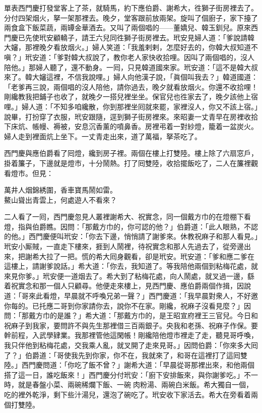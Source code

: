 單表西門慶打發堂客上了茶，就騎馬，約下應伯爵、謝希大，徃獅子街房裡去了。分付四架烟火，拏一架那裡去。晚夕，堂客跟前放兩架。旋叫了個廚子，家下擡了兩食盒下飯菜蔬，兩罈金華酒去。又叫了兩個唱的——董嬌兒、韓玉釧兒。原來西門慶已先使玳安顧轎子，請王六兒同徃獅子街房裡去。玳安見婦人道：「爹說請韓大嬸，那裡晚夕看放烟火。」婦人笑道：「我羞剌剌，怎麼好去的，你韓大叔知道不嗔？」玳安道：「爹對韓大叔說了，教你老人家快收拾哩。因叫了兩個唱的，沒人陪他。」那婦人聽了，還不動身。一囘，只見韓道國來家。玳安道：「這不是韓大叔來了。韓大嬸這裡，不信我說哩。」婦人向他漢子說，「眞個叫我去？」韓道國道：「老爹再三說，兩個唱的沒人陪他，請你過去，晚夕就看放烟火。你還不收拾哩！剛纔教我把鋪子也收了，就晚夕一搭兒裡坐坐。保官兒也徃家去了，晚夕該他上宿哩。」婦人道：「不知多咱纔散，你到那裡坐囘就來罷，家裡沒人，你又不該上宿。」說畢，打扮穿了衣服，玳安跟隨，逕到獅子街房裡來。來昭妻一丈青早在房裡收拾下床炕、帳幔、褥被，安息沉香薰的噴鼻香。{}房裡弔着一對紗燈，籠着一盆炭火。婦人走到裡面炕上坐下。一丈青走出來，道了萬福，拏茶吃了。

西門慶與應伯爵看了囘燈，纔到房子裡。兩個在樓上打雙陸。樓上除了六扇窓戶，掛着簾子，下邊就是燈市，十分鬧熱。打了囘雙陸，收拾擺飯吃了，二人在簾裡觀看燈市。但見：

\begin{myquote}
萬井人烟錦綉圍，香車寶馬鬧如雷。\\鰲山聳出青雲上，何處遊人不看來？
\end{myquote}

二人看了一囘，西門慶忽見人叢裡謝希大、祝實念，同一個戴方巾的在燈棚下看燈，指與伯爵瞧。因問：「那戴方巾的，你可認的他？」伯爵道：「此人眼熟，不認的他。」西門慶便叫玳安：「你去下邊，悄悄請了謝爹來。休教祝麻子和那人看見。」玳安小厮賊，一直走下樓來，捱到人鬧裡，待祝實念和那人先過去了，從旁邊出來，把謝希大拉了一把。慌的希大囘身觀看，卻是玳安。玳安道：「爹和應二爹在這樓上，請謝爹說話。」希大道：「你去，我知道了。等我陪他兩個到粘梅花處，就來見你爹。」玳安便一道烟去了。希大到了粘梅花處，向人鬧處，就叉過一邊，繇着祝實念和那一個人只顧尋。他便走來樓上，{}見西門慶、應伯爵兩個作揖，因說道：「哥來此看燈，早晨就不呼喚兄弟一聲？」西門慶道：「我早晨對衆人，不好邀你每的。已托應二哥到你家請你去，說你不在家。剛纔，祝麻子沒看見麼？」因問：「那戴方巾的是誰？」希大道：「那戴方巾的，是王昭宣府裡王三官兒。今日和祝麻子到我家，要問許不與先生那裡借三百兩銀子。央我和老孫、祝麻子作保。要幹前程，入武學肄業。我那裡管他這閑帳！剛纔陪他燈市裡走了走，聽見哥呼喚，我只伴他到粘梅花處，交我乘人亂，就叉開了走來見哥。」因問伯爵：「你來多大囘了？」伯爵道：「哥使我先到你家，你不在，我就來了，和哥在這裡打了這囘雙陸。」西門慶問道：「你吃了飯不曾？」謝希大道：「早晨從哥那裡出來，和他兩個搭了這一日，誰吃飯來！」西門慶分付玳安：「廚下安排飯來，與你謝爹吃。」不一時，就是春盤小菜、兩碗稀爛下飯、一碗𤆑肉粉湯、兩碗白米飯。希大獨自一個，吃的裡外乾淨，剩下些汁湯兒，還泡了碗吃了。玳安收下家活去。希大在旁看着兩個打雙陸。


